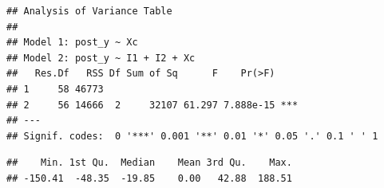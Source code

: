 \documentclass[
]{book}
\newenvironment{Shaded}{\begin{snugshade}}{\end{snugshade}}
\newcommand{\FunctionTok}[1]{\textcolor[rgb]{0.13,0.29,0.53}{\textbf{#1}}}
\newcommand{\NormalTok}[1]{#1}
\newcommand{\SpecialCharTok}[1]{\textcolor[rgb]{0.81,0.36,0.00}{\textbf{#1}}}
\begin{document}
\begin{verbatim}
## Analysis of Variance Table
## 
## Model 1: post_y ~ Xc
## Model 2: post_y ~ I1 + I2 + Xc
##   Res.Df   RSS Df Sum of Sq      F    Pr(>F)    
## 1     58 46773                                  
## 2     56 14666  2     32107 61.297 7.888e-15 ***
## ---
## Signif. codes:  0 '***' 0.001 '**' 0.01 '*' 0.05 '.' 0.1 ' ' 1
\end{verbatim}

\begin{Shaded}
\end{Shaded}

\begin{verbatim}
##    Min. 1st Qu.  Median    Mean 3rd Qu.    Max. 
## -150.41  -48.35  -19.85    0.00   42.88  188.51
\end{verbatim}
\end{document}
